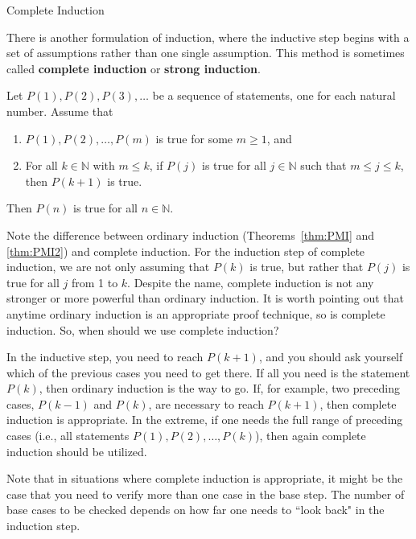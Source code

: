 \begin{section}{Complete Induction}\label{sec:CompleteInduction}

There is another formulation of induction, where the inductive step begins with a set of assumptions rather than one single assumption.  This method is sometimes called \textbf{complete induction} or \textbf{strong induction}.  

\begin{theorem}
Let $P(1), P(2), P(3), \ldots$ be a sequence of statements, one for each natural number.  Assume that
\begin{enumerate}[label=\textrm{(\roman*)}]
\item $P(1),P(2),\ldots, P(m)$ is true for some $m\geq 1$, and
\item For all $k \in \mathbb{N}$ with $m\leq k$, if $P(j)$ is true for all $j\in \mathbb{N}$ such that $m\leq j \leq k$, then $P(k+1)$ is true.  
\end{enumerate}
Then $P(n)$ is true for all $n\in\mathbb{N}$.
\end{theorem}

Note the difference between ordinary induction (Theorems~\ref{thm:PMI} and \ref{thm:PMI2}) and complete induction. For the induction step of complete induction, we are not only assuming that $P(k)$ is true, but rather that $P(j)$ is true for all $j$ from 1 to $k$.  Despite the name, complete induction is not any stronger or more powerful than ordinary induction.  It is worth pointing out that anytime ordinary induction is an appropriate proof technique, so is complete induction. So, when should we use complete induction?

In the inductive step, you need to reach $P(k+1)$, and you should ask yourself which of the previous cases you need to get there. If all you need is the statement $P(k)$, then ordinary induction is the way to go. If, for example, two preceding cases, $P(k - 1)$ and $P(k)$, are necessary to reach $P(k + 1)$, then complete induction is appropriate. In the extreme, if one needs the full range of preceding cases (i.e., all statements $P(1), P(2),\ldots,P(k)$), then again complete induction should be utilized.

Note that in situations where complete induction is appropriate, it might be the case that you need to verify more than one case in the base step. The number of base cases to be checked depends on how far one needs to ``look back" in the induction step.


\end{section}
